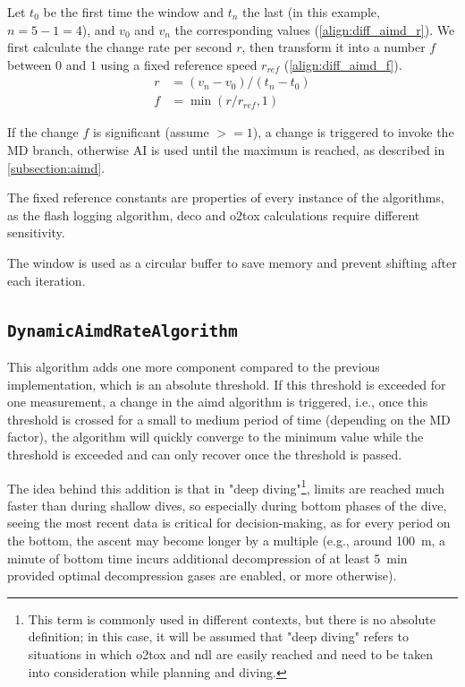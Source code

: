 Let $t_0$ be the first time the window and $t_n$ the last (in this example, $n = 5-1 = 4$), and $v_0$ and $v_n$ the corresponding values (\ref{align:diff_aimd_r}). 
We first calculate the change rate per second $r$, then transform it into a number $f$ between $0$ and $1$ using a fixed reference speed $r_{ref}$ (\ref{align:diff_aimd_f}).
\begin{align}
    r &= (v_n - v_0) / (t_n - t_0) \label{align:diff_aimd_r} \\
    f &= \min(r / r_{ref}, 1) \label{align:diff_aimd_f}
\end{align}

If the change $f$ is significant (assume $>= 1$), a change is triggered to invoke the MD branch, otherwise AI is used until the maximum is reached, as described in \ref{subsection:aimd}.

The fixed reference constants are properties of every instance of the algorithms, as the flash logging algorithm, \gls{deco} and \gls{o2tox} calculations require different sensitivity.

The window is used as a circular buffer to save memory and prevent shifting after each iteration.

\subsection{\lstinline{DynamicAimdRateAlgorithm}}
This algorithm adds one more component compared to the previous implementation, which is an absolute threshold. 
If this threshold is exceeded for one measurement, a change in the \gls{aimd} algorithm is triggered, i.e., once this threshold is crossed for a small to medium period of time (depending on the MD factor), the algorithm will quickly converge to the minimum value while the threshold is exceeded and can only recover once the threshold is passed.

The idea behind this addition is that in "deep diving"\footnote{This term is commonly used in different contexts, but there is no absolute definition; in this case, it will be assumed that "deep diving" refers to situations in which \gls{o2tox} and \gls{ndl} are easily reached and need to be taken into consideration while planning and diving.}, limits are reached much faster than during shallow dives, so especially during bottom phases of the dive, seeing the most recent data is critical for decision-making, as for every period on the bottom, the ascent may become longer by a multiple (e.g., around \SI{100}{\meter}, a minute of bottom time incurs additional decompression of at least \SI{5}{\minute} provided optimal decompression gases are enabled, or more otherwise).

